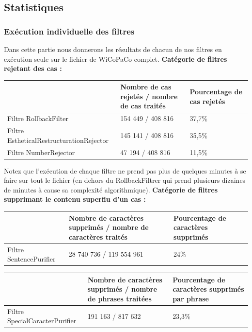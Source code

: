 \documentclass[11pt]{article}
\begin{document}
\subsection{Statistiques}

\subsubsection{Ex\'{e}cution individuelle des filtres}
Dans cette partie nous donnerons les r\'{e}sultats de chacun de nos filtres en ex\'{e}cution seule sur le fichier de WiCoPaCo complet.
\newline
\newline
{\bfseries Cat\'{e}gorie de filtres rejetant des cas :}

\begin{center}
\begin{tabular}{|M{4cm}|M{5cm}|M{6cm}|}
   \hline
    \, &Nombre de cas rejet\'{e}s / nombre de cas trait\'{e}s & Pourcentage de cas rejet\'{e}s \tabularnewline
   \hline
    Filtre RollbackFilter & 154 449 / 408 816 & 37,7\% \tabularnewline
   \hline
    Filtre EstheticalRestructurationRejector & 145 141 / 408 816 & 35,5\% \tabularnewline
   \hline
      Filtre NumberRejector & 47 194 / 408 816 & 11,5\% \tabularnewline
   \hline
\end{tabular}
\end{center}

Notez que l'ex\'{e}cution de chaque filtre ne prend pas plus de quelques minutes \`{a} se faire sur tout le fichier (en dehors du RollbackFiltrer qui prend plusieurs dizaines de minutes \`{a} cause sa complexit\'{e} algorithmique).
\newline
\newline
{\bfseries Cat\'{e}gorie de filtres supprimant le contenu superflu d'un cas :}

\begin{center}
\begin{tabular}{|M{4cm}|M{5cm}|M{6cm}|}
   \hline
    \, &Nombre de caract\`{e}res supprim\'{e}s / nombre de caract\`{e}res trait\'{e}s & Pourcentage de caract\`{e}res supprim\'{e}s \tabularnewline
   \hline
    Filtre SentencePurifier & 28 740 736 / 119 554 961 & 24\% \tabularnewline
   \hline
\end{tabular}
\end{center}


\begin{center}
\begin{tabular}{|M{4cm}|M{5cm}|M{6cm}|}
   \hline
    \, &Nombre de caract\`{e}res supprim\'{e}s / nombre de phrases trait\'{e}es & Pourcentage de caract\`{e}res supprim\'{e}s par phrase\tabularnewline
   \hline
    Filtre SpecialCaracterPurifier & 191 163 / 817 632 & 23,3\% \tabularnewline
   \hline
\end{tabular}
\end{center}
\end{document}
